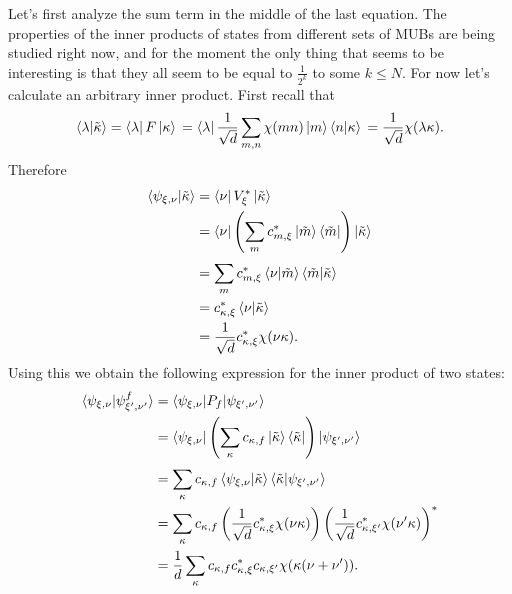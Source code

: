 \documentclass[a4paper]{article}
\begin{document}
  Let's first analyze the sum term in the middle of the last
  equation. The properties of the inner products of states
  from different sets of MUBs are being studied right now,
  and for the moment the only thing that seems to be
  interesting is that they all seem to be equal to
  $\frac{1}{2^k}$ to some $k \le N$. For now let's
  calculate an arbitrary inner product. First recall that
  \begin{equation}
    \braket{\lambda|\tilde\kappa}
    = \bra{\lambda} F\ket{\kappa} \\
    = \bra{\lambda} \frac{1}{\sqrt{d}}\sum_{m,n}^{}
    \chi(mn) \ket{m}\braket{n|\kappa} \\
    = \frac{1}{\sqrt{d}} \chi(\lambda \kappa).
  \end{equation}
  Therefore
  \begin{align}
    \braket{\psi_{\xi,\nu}|\tilde\kappa}
    &= \bra{\nu} V_\xi^* \ket{\tilde\kappa} \\
    &= \bra{\nu} 
    \left( 
      \sum_{m}^{} c_{m,\xi}^* \ket{\tilde m}\bra{\tilde m}
    \right) 
    \ket{\tilde\kappa} \\
    &= \sum_{m}^{} c_{m,\xi}^* \braket{\nu|\tilde m} 
    \braket{\tilde m|\tilde \kappa} \\
    &= c_{\kappa,\xi}^* \braket{\nu|\tilde\kappa} \\
    &= \frac{1}{\sqrt{d}} c_{\kappa,\xi}^* \chi(\nu\kappa).
  \end{align}
  Using this we obtain the following expression for the
  inner product of two states:
  \begin{align}
    \braket{\psi_{\xi,\nu}|\psi_{\xi',\nu'}^f}
    &= \braket{\psi_{\xi,\nu}| P_f |\psi_{\xi',\nu'}} \\
    &= \bra{\psi_{\xi,\nu}} 
    \left( \sum_{\kappa}^{} c_{\kappa,f} 
      \ket{\tilde\kappa}\bra{\tilde\kappa}
    \right) 
    \ket{\psi_{\xi',\nu'}} \\
    &= \sum_{\kappa}^{} c_{\kappa,f} 
    \braket{\psi_{\xi,\nu}|\tilde\kappa}
    \braket{\tilde\kappa|\psi_{\xi',\nu'}} \\
    &= \sum_{\kappa}^{} c_{\kappa,f}
    \left( 
      \frac{1}{\sqrt{d}} c_{\kappa,\xi}^* \chi(\nu\kappa)
    \right) 
    \left( 
      \frac{1}{\sqrt{d}} c_{\kappa,\xi'}^* \chi(\nu'\kappa)
    \right)^* \\
    &= \frac{1}{d} \sum_{\kappa}^{} c_{\kappa,f} 
    c_{\kappa,\xi}^* c_{\kappa,\xi'} \chi(\kappa(\nu+\nu')).
  \end{align}
\end{document}
